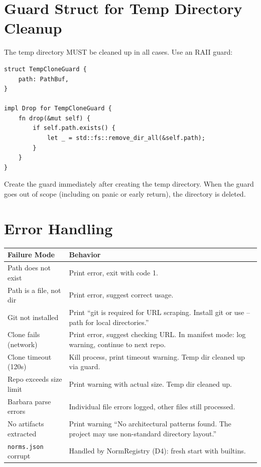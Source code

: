 \documentclass[11pt,a4paper]{article}
\begin{document}
\section{Guard Struct for Temp Directory Cleanup}

The temp directory MUST be cleaned up in all cases. Use an RAII guard:

\begin{lstlisting}[style=rust]
struct TempCloneGuard {
    path: PathBuf,
}

impl Drop for TempCloneGuard {
    fn drop(&mut self) {
        if self.path.exists() {
            let _ = std::fs::remove_dir_all(&self.path);
        }
    }
}
\end{lstlisting}

Create the guard immediately after creating the temp directory.
When the guard goes out of scope (including on panic or early return),
the directory is deleted.


\section{Error Handling}

\begin{longtable}{lp{10cm}}
\toprule
\textbf{Failure Mode} & \textbf{Behavior} \\
\midrule
Path does not exist & Print error, exit with code 1. \\
Path is a file, not dir & Print error, suggest correct usage. \\
Git not installed & Print ``git is required for URL scraping.
  Install git or use --path for local directories.'' \\
Clone fails (network) & Print error, suggest checking URL. In
  manifest mode: log warning, continue to next repo. \\
Clone timeout (120s) & Kill process, print timeout warning.
  Temp dir cleaned up via guard. \\
Repo exceeds size limit & Print warning with actual size.
  Temp dir cleaned up. \\
Barbara parse errors & Individual file errors logged, other
  files still processed. \\
No artifacts extracted & Print warning ``No architectural patterns
  found. The project may use non-standard directory layout.'' \\
\texttt{norms.json} corrupt & Handled by NormRegistry (D4):
  fresh start with builtins. \\
\bottomrule
\end{longtable}
\end{document}
